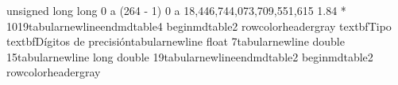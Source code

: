 {}unsigned long long \markdownRendererAmpersand{} 0 a (2\markdownRendererCircumflex{}\markdownRendererLeftBrace{}64\markdownRendererRightBrace{} - 1) \markdownRendererAmpersand{} 0 a 18,446,744,073,709,551,615 \markdownRendererAmpersand{} 1.84 * 10\markdownRendererCircumflex{}\markdownRendererLeftBrace{}19\markdownRendererRightBrace{}\markdownRendererBackslash{}tabularnewline\markdownRendererBackslash{}end\markdownRendererLeftBrace{}mdtable4\markdownRendererRightBrace{}\markdownRendererParagraphSeparator
{}
\markdownRendererSectionEnd \markdownRendererSectionBegin
{}\markdownRendererInterblockSeparator
{}\markdownRendererBackslash{}begin\markdownRendererLeftBrace{}mdtable2\markdownRendererRightBrace{}\markdownRendererSoftLineBreak
{}\markdownRendererBackslash{}rowcolor\markdownRendererLeftBrace{}headergray\markdownRendererRightBrace{}\markdownRendererSoftLineBreak
{}\markdownRendererBackslash{}textbf\markdownRendererLeftBrace{}Tipo\markdownRendererRightBrace{} \markdownRendererAmpersand{} \markdownRendererBackslash{}textbf\markdownRendererLeftBrace{}Dígitos de precisión\markdownRendererRightBrace{}\markdownRendererBackslash{}tabularnewline\markdownRendererSoftLineBreak
{}float \markdownRendererAmpersand{} 7\markdownRendererBackslash{}tabularnewline\markdownRendererSoftLineBreak
{}double \markdownRendererAmpersand{} 15\markdownRendererBackslash{}tabularnewline\markdownRendererSoftLineBreak
{}long double \markdownRendererAmpersand{} 19\markdownRendererBackslash{}tabularnewline\markdownRendererBackslash{}end\markdownRendererLeftBrace{}mdtable2\markdownRendererRightBrace{}\markdownRendererInterblockSeparator
{}\markdownRendererSectionBegin
{}\markdownRendererInterblockSeparator
{}\markdownRendererInterblockSeparator
{}
\markdownRendererSectionEnd \markdownRendererSectionBegin
{}\markdownRendererInterblockSeparator
{}\markdownRendererInterblockSeparator
{}
\markdownRendererSectionEnd 
\markdownRendererSectionEnd 
\markdownRendererSectionEnd \markdownRendererSectionBegin
{}\markdownRendererInterblockSeparator
{}\markdownRendererBackslash{}begin\markdownRendererLeftBrace{}mdtable2\markdownRendererRightBrace{}\markdownRendererSoftLineBreak
{}\markdownRendererBackslash{}rowcolor\markdownRendererLeftBrace{}headergray\markdownRendererRightBrace{}\markdownRendererSoftLineBreak
